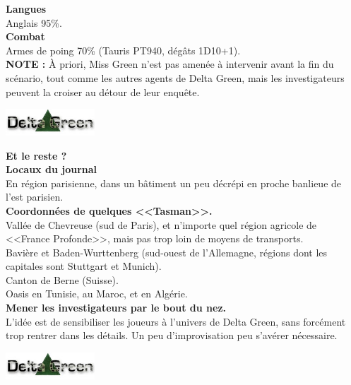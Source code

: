 \documentclass[11pt,twoside,a4paper]{article}
\begin{document}
\begin{multicols}{2}
	\textbf{Langues}~\\
	Anglais 95\%. ~\\
	
	\textbf{Combat}~\\
	Armes de poing 70\% (Tauris PT940, d{\'e}g{\^a}ts 1D10+1). ~\\
	
	\textbf{\textsc{NOTE : }}
	{\`A} priori, Miss Green n'est pas amen{\'e}e {\`a} intervenir avant la fin du sc{\'e}nario, tout comme les autres agents de Delta Green, mais les investigateurs peuvent la croiser au d{\'e}tour de leur enqu{\^e}te. 

\begin{center} \includegraphics[width=0.25\textwidth]{logo_DG.jpg} \end{center}

	\vfill
	\columnbreak

	\textbf{\Large Et le reste ?}~\\
	\textbf{\large Locaux du journal}~\\
	En r{\'e}gion parisienne, dans un b{\^a}timent un peu d{\'e}cr{\'e}pi en proche banlieue de l'est parisien. ~\\
	
	
	\textbf{\large Coordonn{\'e}es de quelques <<Tasman>>. }~\\
	Vall{\'e}e de Chevreuse (sud de Paris), et n'importe quel r{\'e}gion agricole de <<France Profonde>>, mais pas trop loin de moyens de transports. ~\\
	Bavi{\`e}re et Baden-Wurttenberg (sud-ouest de l'Allemagne, r{\'e}gions dont les capitales sont Stuttgart et Munich). ~\\
	Canton de Berne (Suisse). ~\\
	Oasis en Tunisie, au Maroc, et en Alg{\'e}rie. ~\\
	
	
	\textbf{\large Mener les investigateurs par le bout du nez. }~\\
	L'id{\'e}e est de sensibiliser les joueurs {\`a} l'univers de Delta Green, sans forc{\'e}ment trop rentrer dans les d{\'e}tails. Un peu d'improvisation peu s'av{\'e}rer n{\'e}cessaire. 


\begin{center} \includegraphics[width=0.25\textwidth]{logo_DG.jpg} \end{center}

\end{multicols}
\end{document}
